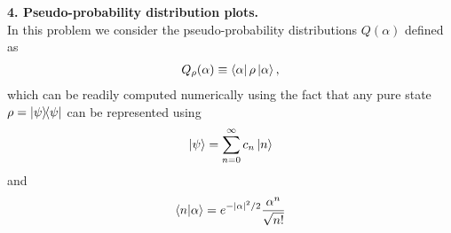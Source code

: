 \documentclass{article}
\theoremstyle{definition}
\newcommand{\al}{\alpha}
\newcommand{\f}[2]{\frac{#1}{#2}}
\begin{document}
\noindent \textbf{4. Pseudo-probability distribution plots.} \\

\noindent In this problem we consider the pseudo-probability distributions $Q(\al)$ defined as 
\begin{align*}
	Q_\rho(\al) \equiv \bra{\al} \rho\ket{\al},
\end{align*}
which can be readily computed numerically using the fact that any pure state $\rho = \ketbra{\psi}$ can be represented using 
\begin{align*}
	\ket{\psi} = \sum_{n=0}^\infty c_n \ket{n}
\end{align*}
and 
\begin{align*}
	\braket{n}{\al} = e^{-\abs{\al}^2/2} \f{\al^n}{\sqrt{n!}}
\end{align*}
\end{document}
